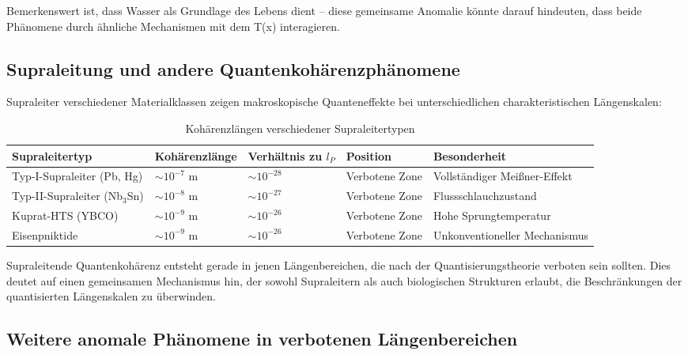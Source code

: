 \documentclass[12pt,a4paper]{article}
\newcommand{\Tfield}{T(x)}
\begin{document}
	Bemerkenswert ist, dass Wasser als Grundlage des Lebens dient – diese gemeinsame Anomalie könnte darauf hindeuten, dass beide Phänomene durch ähnliche Mechanismen mit dem \Tfield{} interagieren.
	
	\subsection{Supraleitung und andere Quantenkohärenzphänomene}
	\label{subsec:supraleitung}
	
	Supraleiter verschiedener Materialklassen zeigen makroskopische Quanteneffekte bei unterschiedlichen charakteristischen Längen\-skalen:
	
	\begin{table}[h]
		\centering
		\begin{adjustbox}{scale=0.75}
			\begin{tabular}{lllll}
				\hline
				\textbf{Supraleitertyp} & \textbf{Kohärenzlänge} & \textbf{Verhältnis zu $l_P$} & \textbf{Position} & \textbf{Besonderheit} \\
				\hline
				Typ-I-Supraleiter (Pb, Hg) & $\sim 10^{-7}$ m & $\sim 10^{-28}$ & Verbotene Zone & Vollständiger Meißner-Effekt \\
				Typ-II-Supraleiter (Nb$_3$Sn) & $\sim 10^{-8}$ m & $\sim 10^{-27}$ & Verbotene Zone & Flussschlauchzustand \\
				Kuprat-HTS (YBCO) & $\sim 10^{-9}$ m & $\sim 10^{-26}$ & Verbotene Zone & Hohe Sprungtemperatur \\
				Eisenpniktide & $\sim 10^{-9}$ m & $\sim 10^{-26}$ & Verbotene Zone & Unkonventioneller Mechanismus \\
				\hline
			\end{tabular}
		\end{adjustbox}
		\caption{Kohärenzlängen verschiedener Supraleitertypen}
		\label{tab:supercond}
	\end{table}
	
	Supraleitende Quanten\-kohärenz entsteht gerade in jenen Längen\-bereichen, die nach der Quantisierungs\-theorie \glqq verboten\grqq{} sein sollten. Dies deutet auf einen gemeinsamen Mechanismus hin, der sowohl Supraleitern als auch biologischen Strukturen erlaubt, die Beschränkungen der quantisierten Längen\-skalen zu überwinden.
	
	\subsection{Weitere anomale Phänomene in verbotenen Längenbereichen}
	\label{subsec:weitere_anomale_phaenomene}
	
\end{document}
